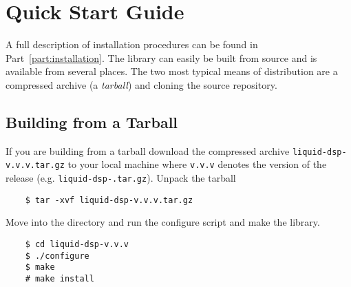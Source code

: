 %
%

\section{Quick Start Guide}
\label{section:quickstart}
A full description of installation procedures can be found in
Part~\ref{part:installation}.
The library can easily be built from source and is available from
several places.
The two most typical means of distribution are a compressed archive
(a {\em tarball}) and cloning the source repository.

\subsection{Building from a Tarball}
\label{section:quickstart:tarball}
If you are building from a tarball
download the compressed archive {\tt liquid-dsp-v.v.v.tar.gz} to your
local machine where {\tt v.v.v} denotes the version of the release
(e.g. {\tt liquid-dsp-\liquidversion.tar.gz}).
% 
%
%
%
%
%
%
Unpack the tarball
%
\begin{verbatim}
    $ tar -xvf liquid-dsp-v.v.v.tar.gz
\end{verbatim}
%
Move into the directory and run the configure script and make the
library.
%
\begin{verbatim}
    $ cd liquid-dsp-v.v.v
    $ ./configure
    $ make
    # make install
\end{verbatim}
%

